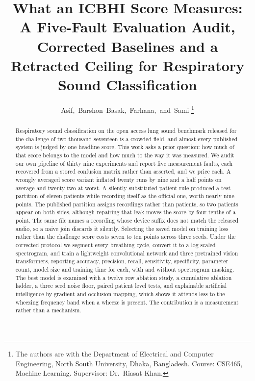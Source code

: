 \documentclass[journal,onecolumn]{IEEEtran}
\begin{document}
\title{What an ICBHI Score Measures: A Five-Fault Evaluation Audit,
Corrected Baselines and a Retracted Ceiling for Respiratory Sound
Classification}

\author{Asif,~Barshon~Basak,~Farhana,~and~Sami%
\thanks{The authors are with the Department of Electrical and Computer
Engineering, North South University, Dhaka, Bangladesh. Course: CSE465,
Machine Learning. Supervisor: Dr.\ Riasat Khan.}}

\maketitle

\begin{abstract}
Respiratory sound classification on the open access lung sound benchmark released
for the challenge of two thousand seventeen is a crowded field, and almost every
published system is judged by one headline score. This work asks a prior question:
how much of that score belongs to the model and how much to the way it was
measured. We audit our own pipeline of thirty nine experiments and report five
measurement faults, each recovered from a stored confusion matrix rather than
asserted, and we price each. A wrongly averaged score variant inflated twenty runs
by nine and a half points on average and twenty two at worst. A silently
substituted patient rule produced a test partition of eleven patients while
recording itself as the official one, worth nearly nine points. The published
partition assigns recordings rather than patients, so two patients appear on both
sides, although repairing that leak moves the score by four tenths of a point. The
same file names a recording whose device suffix does not match the released audio,
so a naive join discards it silently. Selecting the saved model on training loss
rather than the challenge score costs seven to ten points across three seeds.
Under the corrected protocol we segment every breathing cycle, convert it to a log
scaled spectrogram, and train a lightweight convolutional network and three
pretrained vision transformers, reporting accuracy, precision, recall,
sensitivity, specificity, parameter count, model size and training time for each,
with and without spectrogram masking. The best model is examined with a twelve row
ablation study, a cumulative ablation ladder, a three seed noise floor, paired
patient level tests, and explainable artificial intelligence by gradient and
occlusion mapping, which shows it attends less to the wheezing frequency band when
a wheeze is present. The contribution is a measurement rather than a mechanism.
\end{abstract}
\end{document}

